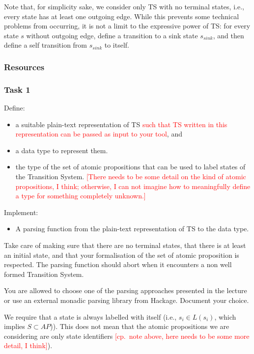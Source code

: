 \documentclass{article}
\begin{document}
Note that, for simplicity sake, we consider only TS with no terminal states, i.e., every state has at least 
one outgoing edge. While this prevents some technical problems from occurring, it is not a limit to the 
expressive power of TS: for every state $s$ without outgoing edge, define a transition to a sink state 
$s_ {sink}$, and then define a self transition from $s_ {sink}$ to itself.

\subsubsection*{Resources}
\cite[Paragraph 2.1]{BaKa}

\subsubsection*{Task 1}
Define:
\begin{itemize}
    \item a suitable plain-text representation of TS \textcolor{red}{such that TS written in this representation
          can be passed as input to your tool}, and
    \item a data type to represent them. 
    \item the type of the set of atomic propositions that can be used to label states of the Transition System.
          \textcolor{red}{[There needs to be some detail on the kind of atomic propositions, I think; 
          otherwise, I can not imagine how to meaningfully define a type for something completely unknown.]}
\end{itemize}
Implement: 
\begin{itemize}
    \item A parsing function from the plain-text representation of TS to the data type.
\end{itemize}
Take care of making sure that there are no terminal states, that there is at least an initial state, 
and that your formalisation of the set of atomic proposition is respected. The parsing function should 
abort when it encounters a non well formed Transition System.

You are allowed to choose one of the parsing approaches presented in the lecture or 
use an external monadic parsing library from Hackage. Document your choice.

We require that a state is always labelled with itself 
(i.e., $s_i \in L(s_i)$, which implies $S \subset AP$)). This does not mean that the atomic propositions 
we are considering are only state identifiers \textcolor{red}{[cp.~note above, here needs to be some
more detail, I think]}).
\end{document}

